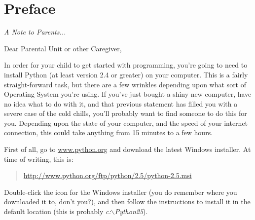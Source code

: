 

\chapter*{Preface}\normalsize
\begin{center}
{\em A Note to Parents...}
\end{center}
\pagestyle{plain}

\noindent
Dear Parental Unit or other Caregiver,

In order for your child to get started with programming, you're going to need to install Python (at least version 2.4 or greater) on your computer.
This is a fairly straight-forward task, but there are a few wrinkles depending upon what sort of Operating System you're using.  If you've just bought a shiny new computer, have no idea what to do with it, and that previous statement has filled you with a severe case of the cold chills, you'll probably want to find someone to do this for you.  Depending upon the state of your computer, and the speed of your internet connection, this could take anything from 15 minutes to a few hours.

\begin{WINDOWS}

\noindent
First of all, go to \href{http://www.python.org}{www.python.org} and download the latest Windows installer.  At time of writing, this is:
\begin{quote}
     \href{http://www.python.org/ftp/python/2.5/python-2.5.msi}{http://www.python.org/ftp/python/2.5/python-2.5.msi}
\end{quote}
Double-click the icon for the Windows installer (you do remember where you downloaded it to, don't you?), and then follow the instructions to install it in the default location (this is probably \emph{c:$\backslash$Python25}).

\end{WINDOWS}


